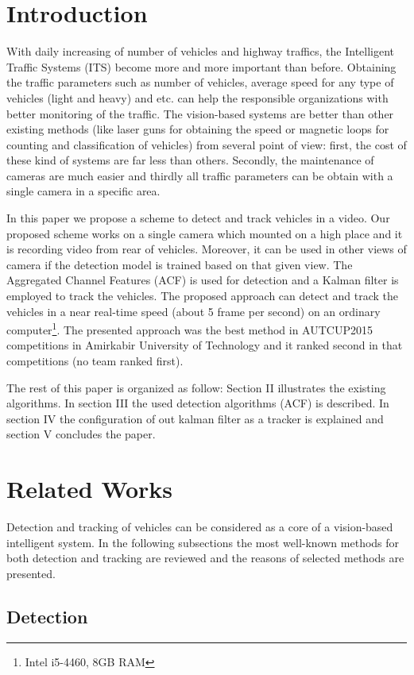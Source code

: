 \documentclass[conference]{IEEEtran}
\begin{document}
\section{Introduction}

With daily increasing of number of vehicles and highway traffics, the Intelligent Traffic Systems (ITS) become more and more important than before. Obtaining the traffic parameters such as number of vehicles, average speed for any type of vehicles (light and heavy) and etc. can help the responsible organizations with better monitoring of the traffic. The vision-based systems are better than other existing methods (like laser guns for obtaining the speed or magnetic loops for counting and classification of vehicles) from several point of view: first, the cost of these kind of systems are far less than others. Secondly, the maintenance of cameras are much easier and thirdly all traffic parameters can be obtain with a single camera in a specific area. 


In this paper we propose a scheme to detect and track vehicles in a video. Our proposed scheme works on a single camera which mounted on a high place and it is recording video from rear of vehicles. Moreover, it can be used in other views of camera if the detection model is trained based on that given view. The Aggregated Channel Features (ACF) is used for detection and a Kalman filter is employed to track the vehicles. The proposed approach can detect and track the vehicles in a near real-time speed (about 5 frame per second) on an ordinary computer\footnote{Intel i5-4460, 8GB RAM}. The presented approach was the best method in AUTCUP2015 competitions in Amirkabir University of Technology and it ranked second in that competitions (no team ranked first).



The rest of this paper is organized as follow: Section II illustrates the existing algorithms. In section III the used detection algorithms (ACF) is described. In section IV the configuration of out kalman filter as a tracker is explained and section V concludes the paper. 
\section{Related Works}
Detection and tracking of vehicles can be considered as a core of a vision-based intelligent system. In the following subsections the most well-known methods for both detection and tracking are reviewed and the reasons of selected methods are presented.
\subsection{Detection}
\end{document}
